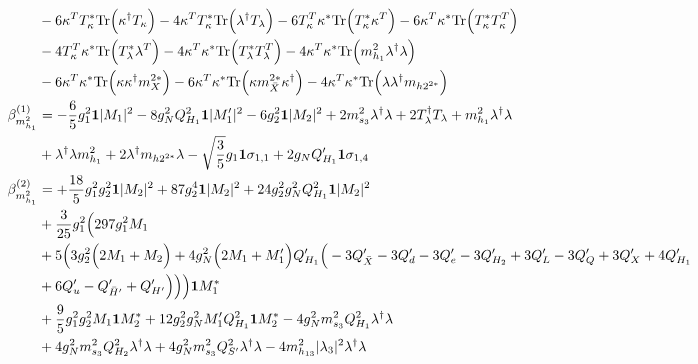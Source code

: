{\begin{align}
 &-6 {\kappa^{T}  T_{\kappa}^*} \mbox{Tr}\Big({\kappa^{\dagger}  T_{\kappa}}\Big) -4 {\kappa^{T}  T_{\kappa}^*} \mbox{Tr}\Big({\lambda^{\dagger}  T_{\lambda}}\Big) -6 {T_{\kappa}^{T}  \kappa^*} \mbox{Tr}\Big({T_{\kappa}^*  \kappa^{T}}\Big) -6 {\kappa^{T}  \kappa^*} \mbox{Tr}\Big({T_{\kappa}^*  T_{\kappa}^{T}}\Big) \nonumber \\ 
 &-4 {T_{\kappa}^{T}  \kappa^*} \mbox{Tr}\Big({T_{\lambda}^*  \lambda^{T}}\Big) -4 {\kappa^{T}  \kappa^*} \mbox{Tr}\Big({T_{\lambda}^*  T_{\lambda}^{T}}\Big) -4 {\kappa^{T}  \kappa^*} \mbox{Tr}\Big({m_{h_1}^2  \lambda^{\dagger}  \lambda}\Big) \nonumber \\ 
 &-6 {\kappa^{T}  \kappa^*} \mbox{Tr}\Big({\kappa  \kappa^{\dagger}  m_{X}^{2 *}}\Big) -6 {\kappa^{T}  \kappa^*} \mbox{Tr}\Big({\kappa  m_{\bar{X}}^{2 *}  \kappa^{\dagger}}\Big) -4 {\kappa^{T}  \kappa^*} \mbox{Tr}\Big({\lambda  \lambda^{\dagger}  m_{{h 2}^{2 *}}}\Big) \\ 
\beta_{m_{h_1}^2}^{(1)} & =  
-\frac{6}{5} g_{1}^{2} {\bf 1} |M_1|^2 -8 g_{N}^{2} Q_{H_1}^{2} {\bf 1} |M_1'|^2 -6 g_{2}^{2} {\bf 1} |M_2|^2 +2 m_{s_3}^2 {\lambda^{\dagger}  \lambda} +2 {T_{\lambda}^{\dagger}  T_{\lambda}} +{m_{h_1}^2  \lambda^{\dagger}  \lambda}\nonumber \\ 
 &+{\lambda^{\dagger}  \lambda  m_{h_1}^2}+2 {\lambda^{\dagger}  m_{{h 2}^{2 *}}  \lambda} - \sqrt{\frac{3}{5}} g_1 {\bf 1} \sigma_{1,1} +2 g_N Q_{H_1}' {\bf 1} \sigma_{1,4} \\ 
\beta_{m_{h_1}^2}^{(2)} & =  
+\frac{18}{5} g_{1}^{2} g_{2}^{2} {\bf 1} |M_2|^2 +87 g_{2}^{4} {\bf 1} |M_2|^2 +24 g_{2}^{2} g_{N}^{2} Q_{H_1}^{2} {\bf 1} |M_2|^2 \nonumber \\ 
 &+\frac{3}{25} g_{1}^{2} \Big(297 g_{1}^{2} M_1 \nonumber \\ 
 &+5 \Big(3 g_{2}^{2} \Big(2 M_1  + M_2\Big) + 4 g_{N}^{2} \Big(2 M_1  + M_1'\Big)Q_{H_1}' \Big(-3 Q_{\bar{X}}'  -3 Q_d'  -3 Q_e'  -3 Q_{H_2}'  + 3 Q_L'  -3 Q_Q'  + 3 Q_X'  + 4 Q_{H_1}'\nonumber\\
&  + 6 Q_u'  - Q_{\bar{H}'}'  + Q_{H'}'\Big)\Big)\Big){\bf 1} M_1^* \nonumber \\ 
 &+\frac{9}{5} g_{1}^{2} g_{2}^{2} M_1 {\bf 1} M_2^* +12 g_{2}^{2} g_{N}^{2} M_1' Q_{H_1}^{2} {\bf 1} M_2^* -4 g_{N}^{2} m_{s_3}^2 Q_{H_1}^{2} {\lambda^{\dagger}  \lambda} \nonumber \\ 
 &+4 g_{N}^{2} m_{s_3}^2 Q_{H_2}^{2} {\lambda^{\dagger}  \lambda} +4 g_{N}^{2} m_{s_3}^2 Q_{S'}^{2} {\lambda^{\dagger}  \lambda} -4 m_{h_{13}}^2 |\lambda_3|^2 {\lambda^{\dagger}  \lambda} \nonumber \\ 

\end{align}}

